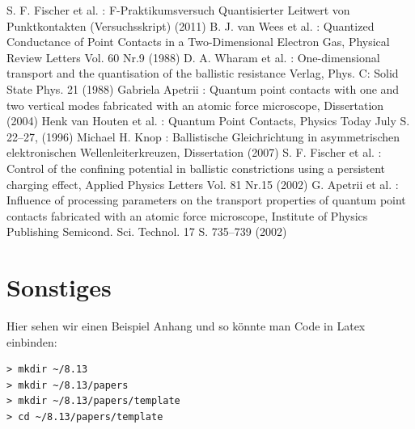 \documentclass[aps,twocolumn,secnumarabic,nobalancelastpage,amsmath,amssymb,
nofootinbib,superscriptaddress]{revtex4-1}
\begin{document}


\begin{thebibliography}{99}
S. F. Fischer et al. : F-Praktikumsversuch Quantisierter Leitwert von Punktkontakten (Versuchsskript) (2011)
B. J. van Wees et al. : Quantized Conductance of Point Contacts in a Two-Dimensional Electron Gas, Physical Review Letters Vol. 60 Nr.9 (1988)
D. A. Wharam et al. : One-dimensional transport and the quantisation of the ballistic resistance Verlag, Phys. C: Solid State Phys. 21  (1988)
Gabriela Apetrii : Quantum point contacts with one and two vertical modes fabricated with an atomic force microscope, Dissertation (2004)
Henk van Houten et al. :  Quantum Point Contacts, Physics Today July S. 22–27, (1996)
Michael H. Knop :  Ballistische Gleichrichtung in asymmetrischen elektronischen Wellenleiterkreuzen, Dissertation (2007)
S. F. Fischer et al. :  Control of the confining potential in ballistic constrictions using a persistent charging effect, Applied Physics Letters Vol. 81 Nr.15 (2002)
G. Apetrii et al. :  Influence of processing parameters on the transport properties of quantum point contacts fabricated with an atomic force microscope, Institute of Physics Publishing Semicond. Sci. Technol. 17 S. 735–739 (2002)
\end{thebibliography}


\clearpage
\appendix

\section{Sonstiges}
Hier sehen wir einen Beispiel Anhang und so könnte man Code in Latex einbinden:
\begin{verbatim}
> mkdir ~/8.13
> mkdir ~/8.13/papers
> mkdir ~/8.13/papers/template
> cd ~/8.13/papers/template
\end{verbatim}


\end{document}
